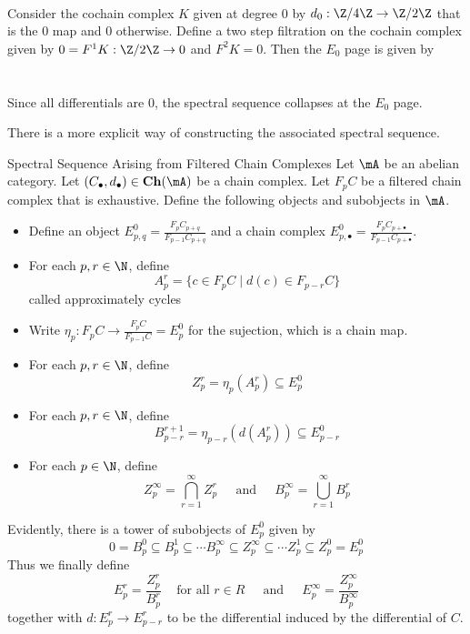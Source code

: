 \documentclass[a4paper]{article}
\begin{document}
\begin{eg}{}{}\\
Consider the cochain complex $K$ given at degree $0$ by $d_0:\Z/4\Z\to\Z/2\Z$ that is the $0$ map and $0$ otherwise. Define a two step filtration on the cochain complex given by $0=F^1K:\Z/2\Z\to 0$ and $F^2K=0$. Then the $E_0$ page is given by \\
\\~\\
Since all differentials are $0$, the spectral sequence collapses at the $E_0$ page. 
\end{eg}

There is a more explicit way of constructing the associated spectral sequence. 

\begin{defn}{Spectral Sequence Arising from Filtered Chain Complexes}{} Let $\mA$ be an abelian category. Let $(C_\bullet,d_\bullet)\in\bold{Ch}(\mA)$ be a chain complex. Let $F_pC$ be a filtered chain complex that is exhaustive. Define the following objects and subobjects in $\mA$. 
\begin{itemize}
\item Define an object $E_{p,q}^0=\frac{F_pC_{p+q}}{F_{p-1}C_{p+q}}$ and a chain complex $E_{p,\bullet}^0=\frac{F_pC_{p+\bullet}}{F_{p-1}C_{p+\bullet}}$. 
\item For each $p,r\in\N$, define $$A_p^r=\{c\in F_pC\;|\;d(c)\in F_{p-r}C\}$$ called approximately cycles
\item Write $\eta_p:F_pC\to\frac{F_pC}{F_{p-1}C}=E_p^0$ for the sujection, which is a chain map. 
\item For each $p,r\in\N$, define $$Z_p^r=\eta_p(A_p^r)\subseteq E_p^0$$
\item For each $p,r\in\N$, define $$B_{p-r}^{r+1}=\eta_{p-r}(d(A_p^r))\subseteq E_{p-r}^0$$
\item For each $p\in\N$, define $$Z_p^\infty=\bigcap_{r=1}^\infty Z_p^r\;\;\;\;\text{ and }\;\;\;\; B_p^\infty=\bigcup_{r=1}^\infty B_p^r$$
\end{itemize}
Evidently, there is a tower of subobjects of $E_p^0$ given by $$0=B_p^0\subseteq B_p^1\subseteq\cdots B_p^\infty\subseteq Z_p^\infty\subseteq\cdots Z_p^1\subseteq Z_p^0=E_p^0$$ Thus we finally define $$E_p^r=\frac{Z_p^r}{B_p^r}\;\;\;\text{ for all }r\in R\;\;\;\;\text{ and }\;\;\;\;E_p^\infty=\frac{Z_p^\infty}{B_p^\infty}$$ together with $d:E_p^r\to E_{p-r}^r$ to be the differential induced by the differential of $C$. 
\end{defn}
\end{document}
